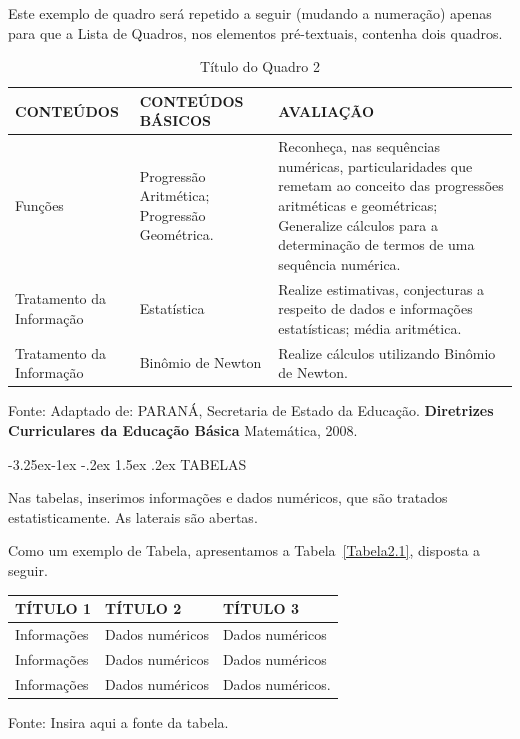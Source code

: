 \documentclass[a4paper,12pt]{report}%
\makeatletter
\newcommand{\secfnt}{\fontsize{12}{12}}
\renewcommand\subsection{\@startsection{subsection}{2}{\z@}%
                {-3.25ex\@plus -1ex \@minus -.2ex}%
                {1.5ex \@plus.2ex}%
                {\normalfont\secfnt}}
\makeatother
\begin{document}
Este exemplo de quadro será repetido a seguir (mudando a numeração) apenas para que a Lista de Quadros, nos elementos pré-textuais, contenha dois quadros.

\begin{table}[!ht]
\begin{center}
\caption{\small Título do Quadro 2} \label{Quadro2.2}
\vspace{-0.2cm}
 \begin{tabular}{|p{3.8cm}|p{4.4cm}|p{6.0cm}|}
  \hline
  CONTEÚDOS & CONTEÚDOS \newline BÁSICOS & AVALIAÇÃO  \\ \hline
  Funções  & Progressão Aritmética; \newline Progressão Geométrica. 
  & Reconheça, nas sequências numéricas, particularidades que remetam ao conceito das progressões aritméticas e geométricas; 
  \newline Generalize cálculos para a determinação de termos de uma sequência numérica. \\ \hline 
  Tratamento da Informação & Estatística & Realize estimativas, conjecturas a respeito de dados e informações estatísticas; média aritmética. \\ \hline
  Tratamento da Informação & Binômio de Newton & Realize cálculos utilizando Binômio de Newton.
  \\ \hline
 \end{tabular}
\end{center}
{\small Fonte: Adaptado de: PARANÁ, Secretaria de Estado da Educação. {\bf Diretrizes Curriculares da Educação Básica} Matemática, 2008.}
\end{table}

\subsection{TABELAS}\label{Subsec2.2.2}

\hspace{0.5cm} 
Nas tabelas, inserimos informações e dados numéricos, que são tratados estatisticamente. As laterais são abertas.

Como um exemplo de Tabela, apresentamos a Tabela~\ref{Tabela2.1}, disposta a seguir.

\begin{Ttable}[!ht]
\begin{center}
\caption{\small Título da Tabela 1} 
\label{Tabela2.1}
\vspace{-0.2cm}
 \begin{tabular}{p{3.8cm}|p{3.8cm}|p{6.6cm}}
    \hline
    TÍTULO 1 & TÍTULO 2 & TÍTULO 3 
    \\ \hline
    Informações & Dados numéricos & Dados numéricos 
    \\  
    Informações & Dados numéricos & Dados numéricos 
    \\ 
    Informações & Dados numéricos & Dados numéricos.
    \\ \hline
 \end{tabular}
\end{center}
{\small Fonte: Insira aqui a fonte da tabela.}
\end{Ttable}
\end{document}
